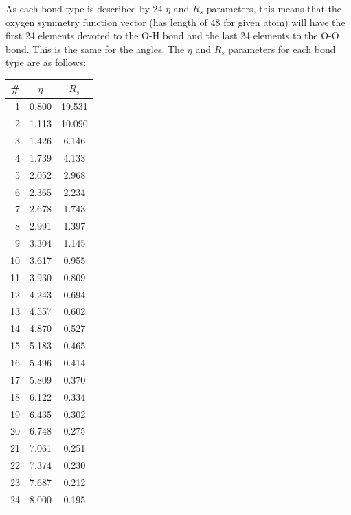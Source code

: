 \documentclass{article}
\begin{document}
As each bond type is described by 24 $\eta$ and $R_s$ parameters, this means that the oxygen symmetry function vector (has length of 48 for given atom) will have the first 24 elements devoted to the O-H bond and the last 24 elements to the O-O bond. This is the same for the angles. The $\eta$ and $R_s$ parameters for each bond type are as follows:

\begin{multicols}{3}
\begin{tabular}{| r | c | c |}
\hline
\# & $\eta$ & $R_s$ \\ 
\hline
 1  &   0.800  &  19.531  \\
 2  &   1.113  &  10.090  \\
 3  &   1.426  &   6.146  \\
 4  &   1.739  &   4.133  \\
 5  &   2.052  &   2.968  \\
 6  &   2.365  &   2.234  \\
 7  &   2.678  &   1.743  \\
 8  &   2.991  &   1.397  \\
 9  &   3.304  &   1.145  \\
10  &   3.617  &   0.955  \\
11  &   3.930  &   0.809  \\
12  &   4.243  &   0.694  \\
13  &   4.557  &   0.602  \\
14  &   4.870  &   0.527  \\
15  &   5.183  &   0.465  \\
16  &   5.496  &   0.414  \\
17  &   5.809  &   0.370  \\
18  &   6.122  &   0.334  \\
19  &   6.435  &   0.302  \\
20  &   6.748  &   0.275  \\
21  &   7.061  &   0.251  \\
22  &   7.374  &   0.230  \\
23  &   7.687  &   0.212  \\
24  &   8.000  &   0.195  \\
\hline
\end{tabular}


\end{multicols}
\end{document}
